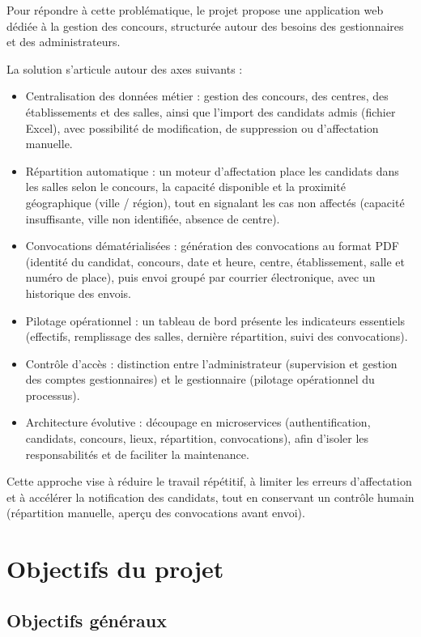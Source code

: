 \begin{onehalfspace}
Pour répondre à cette problématique, le projet propose une application web dédiée à la gestion des concours, structurée autour des besoins des gestionnaires et des administrateurs.

La solution s'articule autour des axes suivants :

\begin{itemize}
  \item Centralisation des données métier : gestion des concours, des centres, des établissements et des salles, ainsi que l'import des candidats admis (fichier Excel), avec possibilité de modification, de suppression ou d'affectation manuelle.
  \item Répartition automatique : un moteur d'affectation place les candidats dans les salles selon le concours, la capacité disponible et la proximité géographique (ville / région), tout en signalant les cas non affectés (capacité insuffisante, ville non identifiée, absence de centre).
  \item Convocations dématérialisées : génération des convocations au format PDF (identité du candidat, concours, date et heure, centre, établissement, salle et numéro de place), puis envoi groupé par courrier électronique, avec un historique des envois.
  \item Pilotage opérationnel : un tableau de bord présente les indicateurs essentiels (effectifs, remplissage des salles, dernière répartition, suivi des convocations).
  \item Contrôle d'accès : distinction entre l'administrateur (supervision et gestion des comptes gestionnaires) et le gestionnaire (pilotage opérationnel du processus).
  \item Architecture évolutive : découpage en microservices (authentification, candidats, concours, lieux, répartition, convocations), afin d'isoler les responsabilités et de faciliter la maintenance.
\end{itemize}

Cette approche vise à réduire le travail répétitif, à limiter les erreurs d'affectation et à accélérer la notification des candidats, tout en conservant un contrôle humain (répartition manuelle, aperçu des convocations avant envoi).

\section{Objectifs du projet}

\subsection{Objectifs généraux}


\end{onehalfspace}
